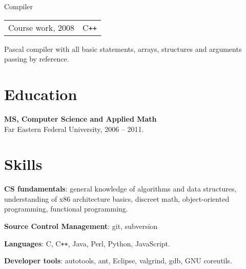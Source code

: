 \documentclass[a4paper]{article}
\begin{document}
\begin{multicols}{2}


		\begin{project}{Compiler}{\begin{tabular}{@{}l|l}Course work, 2008 & C\texttt{++}\\\end{tabular}}
			Pascal compiler with all basic statements, arrays, structures and arguments passing by reference.
		\end{project}
	\end{multicols}

	\section{Education}
	\begin{items}
		\item \textbf{MS, Computer Science and Applied Math}\\
		Far Eastern Federal University, 2006 -- 2011.
	\end{items}

	\section{Skills}
	\begin{multicols}{2}
		\raggedcolumns
		\begin{items}
			\item \textbf{CS fundamentals}: general knowledge of algorithms and data structures, understanding of x86 architecture basics, discreet math, object-oriented programming, functional programming.
			\item \textbf{Source Control Management}: git, subversion
			\columnbreak
			\item \textbf{Languages}: C, C\texttt{++}, Java, Perl, Python, JavaScript.
			\item \textbf{Developer tools}: autotools, ant, Eclipse, valgrind, gdb, GNU coreutils.
		\end{items}
	\end{multicols}
\end{document}
